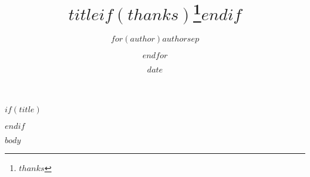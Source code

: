 \documentclass[12pt]{article}
\title{$title$$if(thanks)$\thanks{$thanks$}$endif$}
\author{$for(author)$$author$$sep$ \and $endfor$}
\date{$date$}
\begin{document}
$if(title)$
\maketitle
$endif$

$body$
\end{document}
